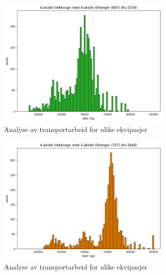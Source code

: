 \begin{figure}[H]
    \centering
    \includegraphics[width=0.75\textwidth]{images/n68.png}
    \caption{Analyse av transportarbeid for ulike ekvipasjer}
    \label{fig:n68}
\end{figure}

\begin{figure}[H]
    \centering
    \includegraphics[width=0.75\textwidth]{images/n74.png}
    \caption{Analyse av transportarbeid for ulike ekvipasjer}
    \label{fig:n74}
\end{figure}
